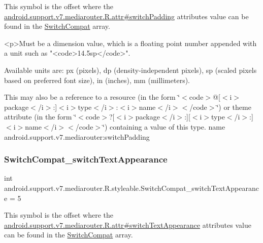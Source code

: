 This symbol is the offset where the \hyperlink{classandroid_1_1support_1_1v7_1_1mediarouter_1_1R_1_1attr_a001d27a3e0d1776fea64d26a770af4a5}{android.\+support.\+v7.\+mediarouter.\+R.\+attr\#switch\+Padding} attribute\textquotesingle{}s value can be found in the \hyperlink{classandroid_1_1support_1_1v7_1_1mediarouter_1_1R_1_1styleable_af5c7f83276b6c88619833dc8bebeacd9}{Switch\+Compat} array.

\begin{DoxyVerb}      <p>Must be a dimension value, which is a floating point number appended with a unit such as "<code>14.5sp</code>".
\end{DoxyVerb}
 Available units are\+: px (pixels), dp (density-\/independent pixels), sp (scaled pixels based on preferred font size), in (inches), mm (millimeters). 

This may also be a reference to a resource (in the form \char`\"{}$<$code$>$@\mbox{[}$<$i$>$package$<$/i$>$\+:\mbox{]}$<$i$>$type$<$/i$>$\+:$<$i$>$name$<$/i$>$$<$/code$>$\char`\"{}) or theme attribute (in the form \char`\"{}$<$code$>$?\mbox{[}$<$i$>$package$<$/i$>$\+:\mbox{]}\mbox{[}$<$i$>$type$<$/i$>$\+:\mbox{]}$<$i$>$name$<$/i$>$$<$/code$>$\char`\"{}) containing a value of this type.  name android.\+support.\+v7.\+mediarouter\+:switch\+Padding \mbox{\label{classandroid_1_1support_1_1v7_1_1mediarouter_1_1R_1_1styleable_a7b7c45a6e2f6226aaece7ebb5417ffcb}} 
\subsubsection{\texorpdfstring{Switch\+Compat\+\_\+switch\+Text\+Appearance}{SwitchCompat\_switchTextAppearance}}
{\footnotesize\ttfamily int android.\+support.\+v7.\+mediarouter.\+R.\+styleable.\+Switch\+Compat\+\_\+switch\+Text\+Appearance = 5\hspace{0.3cm}{\ttfamily [static]}}

This symbol is the offset where the \hyperlink{classandroid_1_1support_1_1v7_1_1mediarouter_1_1R_1_1attr_ab2bb1fa141648601404a2b2b2462acf9}{android.\+support.\+v7.\+mediarouter.\+R.\+attr\#switch\+Text\+Appearance} attribute\textquotesingle{}s value can be found in the \hyperlink{classandroid_1_1support_1_1v7_1_1mediarouter_1_1R_1_1styleable_af5c7f83276b6c88619833dc8bebeacd9}{Switch\+Compat} array.

